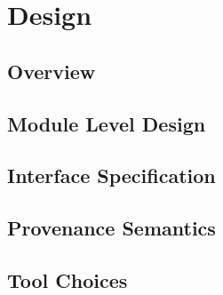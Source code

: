 \documentclass[10pt]{article}
\begin{document}
\section{Design}

\subsection{Overview}


\subsection{Module Level Design}


\subsection{Interface Specification}


\subsection{Provenance Semantics}


\subsection{Tool Choices}

\end{document}
